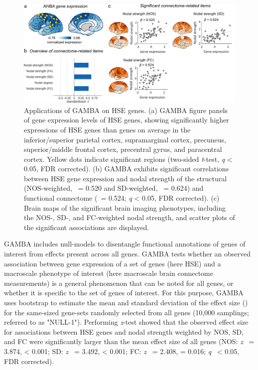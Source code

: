 \begin{refsection}
\begin{figure}[h]
    \centering
    \includegraphics[width=\linewidth]{images/gambaFig2.png}
    \caption{Applications of GAMBA on HSE genes. (a) GAMBA figure panels of gene expression levels of HSE genes, showing significantly higher expressions of HSE genes than genes on average in the inferior/superior parietal cortex, supramarginal cortex, precuneus, superior/middle frontal cortex, precentral gyrus, and paracentral cortex. Yellow dots indicate significant regions (two-sided \textit{t}-test, \textit{q} < 0.05, FDR corrected). (b) GAMBA exhibits significant correlations between HSE gene expression and nodal strength of the structural (NOS-weighted, \textbeta \ = 0.520 and SD-weighted, \textbeta \ = 0.624) and functional connectome (\textbeta \ = 0.524; \textit{q} < 0.05, FDR corrected). (c) Brain maps of the significant brain imaging phenotypes, including the NOS-, SD-, and FC-weighted nodal strength, and scatter plots of the significant associations are displayed.}
    \label{gambaFig2}
\end{figure}

GAMBA includes null-models to disentangle functional annotations of genes of interest from effects present across all genes. GAMBA tests whether an observed association between gene expression of a set of genes (here HSE) and a macroscale phenotype of interest (here macroscale brain connectome measurements) is a general phenomenon that can be noted for all genes, or whether it is specific to the set of genes of interest. For this purpose, GAMBA uses bootstrap to estimate the mean and standard deviation of the effect size (\textbeta) for the same-sized gene-sets randomly selected from all genes (10,000 samplings; referred to as "NULL-1"). Performing \textit{z}-test showed that the observed effect size for associations between HSE genes and nodal strength weighted by NOS, SD, and FC were significantly larger than the mean effect size of all genes (NOS: \textit{z} \ = 3.874, \pval < 0.001; SD: \textit{z} \ = 3.492, \pval < 0.001; FC: \textit{z} \ = 2.408, \pval =  0.016; \textit{q} \ < 0.05, FDR corrected). 


\end{refsection}
